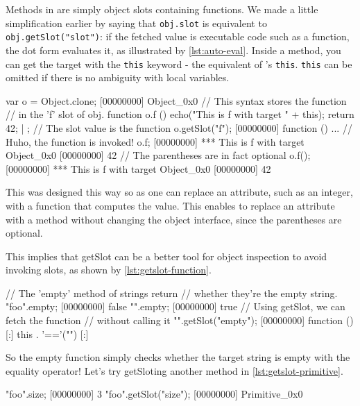 \documentclass[openright,twoside,12pt]{report}
\begin{document}
Methods in \urbi are simply object slots containing functions. We made
a little simplification earlier by saying that \lstinline|obj.slot| is
equivalent to \lstinline|obj.getSlot("slot")|: if the fetched value is
executable code such as a function, the dot form evaluates it, as
illustrated by \autoref{lst:auto-eval}. Inside a method, you can get the
target with the \lstinline|this| keyword - the equivalent of \Cxx's
\texttt{this}. \lstinline|this| can be omitted if there is no
ambiguity with local variables.

\begin{urbiscript}[caption=Function in object are automatically evaluated,
label=lst:auto-eval]
var o = Object.clone;
[00000000] Object_0x0
// This syntax stores the function
// in the 'f' slot of obj.
function o.f ()
{
  echo("This is f with target " + this);
  return 42;
} | {};
// The slot value is the function
o.getSlot("f");
[00000000] function () { ... }
// Huho, the function is invoked!
o.f;
[00000000] *** This is f with target Object_0x0
[00000000] 42
// The parentheses are in fact optional
o.f();
[00000000] *** This is f with target Object_0x0
[00000000] 42
\end{urbiscript}

This was designed this way so as one can replace an attribute, such as
an integer, with a function that computes the value. This enables to
replace an attribute with a method without changing the object
interface, since the parentheses are optional.

This implies that getSlot can be a better tool for object inspection
to avoid invoking slots, as shown by \autoref{lst:getslot-function}.

\begin{urbiscript}[caption=Inspecting executable slots with \texttt{getSlot},
label=lst:getslot-function]
// The 'empty' method of strings return
// whether they're the empty string.
"foo".empty;
[00000000] false
"".empty;
[00000000] true
// Using getSlot, we can fetch the function
// without calling it
"".getSlot("empty");
[00000000] function () {
[:]  this . '=='("")
[:]}
\end{urbiscript}

So the empty function simply checks whether the target string is empty
with the equality operator! Let's try getSloting another method in
\autoref{lst:getslot-primitive}.

\begin{urbiscript}[caption=Primitives, label=lst:getslot-primitive]
"foo".size;
[00000000] 3
"foo".getSlot("size");
[00000000] Primitive_0x0
\end{urbiscript}
\end{document}
